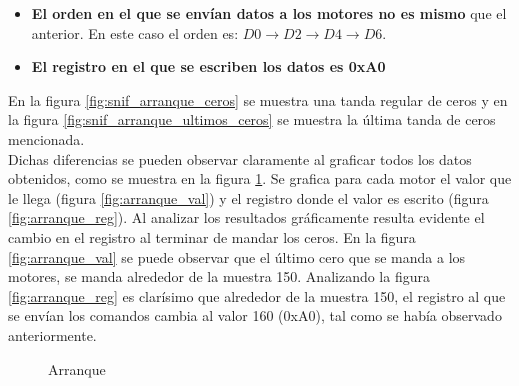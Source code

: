 \documentclass[main]{subfiles}
\begin{document}
\begin{itemize}
\item \textbf{El orden en el que se env\'ian datos a los motores no es mismo} que el anterior. En este caso el orden es: $D0\rightarrow D2\rightarrow D4\rightarrow D6$.
\item \textbf{El registro en el que se escriben los datos es 0xA0}
\end{itemize}

En la figura \ref{fig:snif_arranque_ceros} se muestra una tanda regular de ceros y en la figura \ref{fig:snif_arranque_ultimos_ceros} se muestra la \'ultima tanda de ceros mencionada.\\

Dichas diferencias se pueden observar claramente al graficar todos los datos obtenidos, como se muestra en la figura \ref{fig:arranque}. Se grafica para cada motor el valor que le llega (figura \ref{fig:arranque_val}) y el registro donde el valor es escrito (figura \ref{fig:arranque_reg}). Al analizar los resultados gr\'aficamente resulta evidente el cambio en el registro al terminar de mandar los ceros. En la figura \ref{fig:arranque_val} se puede observar que el \'ultimo cero que se manda a los motores, se manda alrededor de la muestra 150. Analizando la figura \ref{fig:arranque_reg} es clar\'isimo que alrededor de la muestra 150, el registro al que se env\'ian los comandos cambia al valor 160 (0xA0), tal como se hab\'ia observado anteriormente.

\begin{figure} [h!]
\centering
  \caption{Arranque}
  \label{fig:arranque}
\end{figure}
\end{document}
